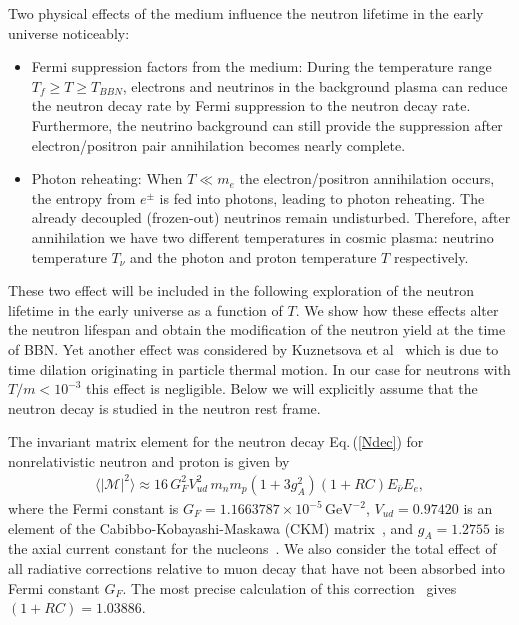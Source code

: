 Two physical effects of the medium  influence the neutron lifetime in the early universe noticeably:
\begin{itemize}
\item Fermi suppression factors from the medium: 
During the temperature range $T_f\geqslant T\geqslant T_{BBN}$, electrons and neutrinos in the background plasma can reduce the neutron decay rate by Fermi suppression to the neutron decay rate. Furthermore, the neutrino background can still provide the suppression after electron/positron pair annihilation becomes nearly complete.
\item Photon reheating:
When $T\ll m_e$ the electron/positron annihilation occurs, the entropy from $e^\pm$ is fed into photons, leading to photon reheating. The already decoupled (frozen-out) neutrinos remain undisturbed. Therefore, after annihilation we have two different temperatures in cosmic plasma: neutrino temperature $T_\nu$ and the photon and proton temperature $T$ respectively.
\end{itemize}
These two effect will be included in the following exploration of the neutron lifetime in the early universe as a function of $T$. We show how these effects alter the neutron lifespan and obtain the modification of the neutron yield at the time of BBN. Yet another effect was considered by Kuznetsova et al~\cite{Kuznetsova:2010pi} which is due to time dilation originating in particle thermal motion. In our case for neutrons with $T/m<10^{-3}$ this effect is negligible. Below we will explicitly assume that the neutron decay is studied in the neutron rest frame.


The invariant matrix element for the neutron decay Eq.\,(\ref{Ndec}) for nonrelativistic neutron and proton is given by
\begin{align}
\langle|\mathcal{M}|^2\rangle\approx16\,G^2_FV^2_{ud}\,m_nm_p(1+3g^2_A)(1+RC)E_{\bar{\nu}}E_e,
\end{align}
where the Fermi constant is $G_F=1.1663787\times10^{-5}\,\mathrm{GeV}^{-2}$, $V_{ud}=0.97420$ is an element of the Cabibbo-Kobayashi-Maskawa (CKM) matrix~\cite{Czarnecki:2018okw,Marciano:2005ec,Czarnecki:2004cw}, and $g_A=1.2755$ is the axial current constant for the nucleons~\cite{Czarnecki:2018okw,Marciano:2014ria}. We also consider the total effect of all radiative corrections relative to muon decay that have not been absorbed into Fermi constant $G_F$. The most precise calculation of this correction~\cite{Marciano:2014ria,Marciano:2005ec} gives $(1+RC)=1.03886$. 

